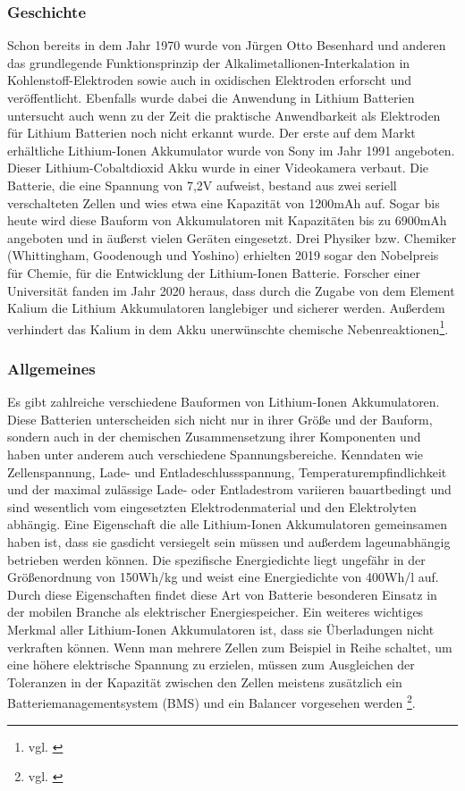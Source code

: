 \subsubsection{Geschichte}
Schon bereits in dem Jahr 1970 wurde von Jürgen Otto Besenhard und anderen das grundlegende Funktionsprinzip der Alkalimetallionen-Interkalation in Kohlenstoff-Elektroden sowie auch in oxidischen Elektroden erforscht und veröffentlicht. Ebenfalls wurde dabei die Anwendung in Lithium Batterien untersucht auch wenn zu der Zeit die praktische Anwendbarkeit als Elektroden für Lithium Batterien noch nicht erkannt wurde. Der erste auf dem Markt erhältliche Lithium-Ionen Akkumulator wurde von Sony im Jahr 1991 angeboten. Dieser Lithium-Cobaltdioxid Akku wurde in einer Videokamera verbaut. Die Batterie, die eine Spannung von 7,2V aufweist, bestand aus zwei seriell verschalteten Zellen und wies etwa eine Kapazität von 1200mAh auf. Sogar bis heute wird diese Bauform von Akkumulatoren mit Kapazitäten
bis zu 6900mAh angeboten und in äußerst vielen Geräten eingesetzt. Drei Physiker bzw. Chemiker (Whittingham, Goodenough und Yoshino) erhielten 2019 sogar den Nobelpreis für Chemie, für die Entwicklung der Lithium-Ionen Batterie.
Forscher einer Universität fanden im Jahr 2020 heraus, dass durch die Zugabe von dem Element Kalium die Lithium Akkumulatoren langlebiger und sicherer werden. Außerdem verhindert das Kalium in dem Akku unerwünschte chemische Nebenreaktionen\footnote{vgl. \cite{Lithium-Ionen-AkkumulatorGeschichte}}.

\subsubsection{Allgemeines}
Es gibt zahlreiche verschiedene Bauformen von Lithium-Ionen Akkumulatoren. Diese Batterien unterscheiden sich nicht nur in ihrer Größe und der Bauform, sondern auch in der chemischen Zusammensetzung ihrer Komponenten und haben unter anderem auch verschiedene Spannungsbereiche. Kenndaten wie Zellenspannung, Lade- und Entladeschlussspannung, Temperaturempfindlichkeit und der maximal zulässige Lade- oder Entladestrom variieren bauartbedingt und sind wesentlich vom eingesetzten Elektrodenmaterial und den Elektrolyten abhängig. Eine Eigenschaft die alle Lithium-Ionen Akkumulatoren gemeinsamen haben ist, dass sie gasdicht versiegelt sein müssen und außerdem lageunabhängig betrieben werden können. Die spezifische Energiedichte liegt ungefähr in der Größenordnung von 150Wh/kg und weist eine Energiedichte von 400Wh/l auf. Durch diese Eigenschaften findet diese Art von Batterie besonderen Einsatz in der mobilen Branche als elektrischer Energiespeicher. Ein weiteres wichtiges Merkmal aller Lithium-Ionen Akkumulatoren ist, dass sie Überladungen nicht verkraften können. Wenn man mehrere Zellen zum Beispiel in Reihe schaltet, um eine höhere elektrische Spannung zu erzielen, müssen zum Ausgleichen der Toleranzen in der Kapazität zwischen den Zellen meistens zusätzlich ein Batteriemanagementsystem (BMS) und ein Balancer vorgesehen werden \footnote{vgl. \cite{Lithium-Ionen-AkkumulatorAllgemeines}}.
\newpage


